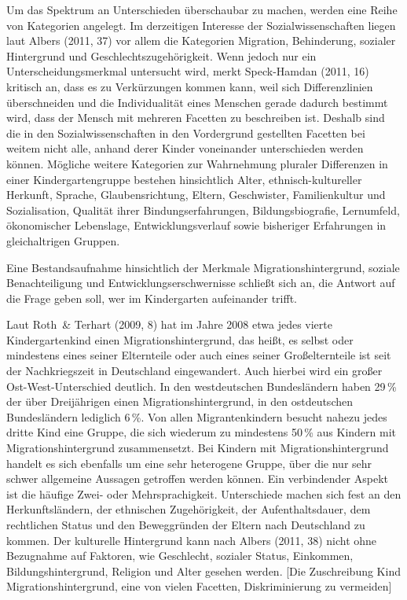 Um das Spektrum an Unterschieden überschaubar zu machen, werden eine Reihe von Kategorien angelegt. Im derzeitigen Interesse der Sozialwissenschaften liegen laut Albers (2011, 37) vor allem die Kategorien Migration, Behinderung, sozialer Hintergrund und Geschlechtszugehörigkeit.
Wenn jedoch nur ein Unterscheidungsmerkmal untersucht wird, merkt 
Speck-Hamdan (2011, 16) kritisch an, dass es zu Verkürzungen kommen kann, weil sich Differenzlinien überschneiden und die Individualität eines Menschen gerade dadurch bestimmt wird, dass der Mensch mit mehreren Facetten zu beschreiben ist. Deshalb sind die in den Sozialwissenschaften in den Vordergrund gestellten Facetten bei weitem nicht alle, anhand derer Kinder voneinander unterschieden werden können. Mögliche weitere Kategorien zur Wahrnehmung pluraler Differenzen in einer Kindergartengruppe bestehen hinsichtlich Alter, ethnisch-kultureller Herkunft, Sprache, Glaubensrichtung, Eltern, Geschwister, Familienkultur und Sozialisation, Qualität ihrer Bindungserfahrungen, Bildungsbiografie, Lernumfeld, ökonomischer Lebenslage, Entwicklungsverlauf sowie bisheriger Erfahrungen in gleichaltrigen Gruppen. 

Eine Bestandsaufnahme hinsichtlich der Merkmale Migrationshintergrund, soziale Benachteiligung und Entwicklungserschwernisse schließt sich an, die Antwort auf die Frage geben soll, wer im Kindergarten aufeinander trifft. 

Laut Roth~\& Terhart (2009, 8) hat im Jahre 2008 etwa jedes vierte Kindergartenkind einen Migrationshintergrund, das heißt, es selbst oder mindestens eines seiner Elternteile oder auch eines seiner Großelternteile ist seit der Nachkriegszeit in Deutschland eingewandert. Auch hierbei wird ein großer Ost-West-Unterschied deutlich. In den westdeutschen Bundesländern haben 29\,\% der über Dreijährigen einen Migrationshintergrund, in den ostdeutschen Bundesländern lediglich 6\,\%. Von allen Migrantenkindern besucht nahezu jedes dritte Kind eine Gruppe, die sich wiederum zu mindestens 50\,\% aus Kindern mit Migrationshintergrund zusammensetzt. Bei Kindern mit Migrationshintergrund handelt es sich ebenfalls um eine sehr heterogene Gruppe, über die nur sehr schwer allgemeine Aussagen getroffen werden können. Ein verbindender Aspekt ist die häufige Zwei- oder Mehrsprachigkeit. Unterschiede machen sich fest an den Herkunftsländern, der ethnischen Zugehörigkeit, der Aufenthaltsdauer, dem rechtlichen Status und den Beweggründen der Eltern nach Deutschland zu kommen. Der kulturelle Hintergrund kann nach Albers (2011, 38) nicht ohne Bezugnahme auf Faktoren, wie Geschlecht, sozialer Status, Einkommen, Bildungshintergrund, Religion und Alter gesehen werden. [Die Zuschreibung Kind Migrationshintergrund, eine von vielen Facetten, Diskriminierung zu vermeiden]
 

